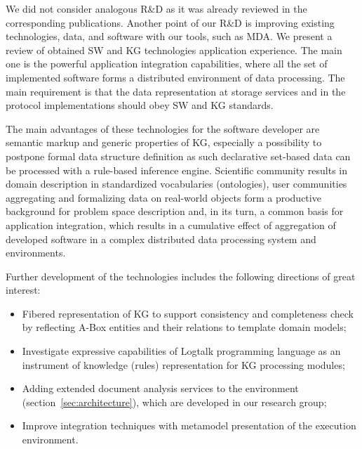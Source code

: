 \documentclass[
]{ceurart}
\begin{document}
We did not consider analogous R\&D as it was already reviewed in the corresponding publications.  Another point of our R\&D is improving existing technologies, data, and software with our tools, such as MDA.  We present a review of obtained SW and KG technologies application experience.  The main one is the powerful application integration capabilities, where all the set of implemented software forms a distributed environment of data processing.  The main requirement is that the data representation at storage services and in the protocol implementations should obey SW and KG standards.

The main advantages of these technologies for the software developer are semantic markup and generic properties of KG, especially a possibility to postpone formal data structure definition as such declarative set-based data can be processed with a rule-based inference engine.  Scientific community results in domain description in standardized vocabularies (ontologies), user communities aggregating and formalizing data on real-world objects form a productive background for problem space description and,  in its turn, a common basis for application integration, which results in a cumulative effect of aggregation of developed software in a complex distributed data processing system and environments.

Further development of the technologies includes the following directions of great interest:
\begin{itemize}
\item Fibered representation of KG to support consistency and completeness check by reflecting A-Box entities and their relations to template domain models;
\item Investigate expressive capabilities of Logtalk programming language as an instrument of knowledge (rules) representation for KG processing modules;
\item Adding extended document analysis services \cite{shigpaper} to the environment (section~\ref{sec:architecture}), which are developed in our research group;
\item Improve integration techniques with metamodel presentation of the execution environment.
\end{itemize}
\end{document}
